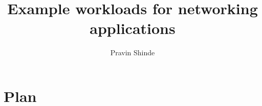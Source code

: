 \documentclass{book}
\begin{document}
\title{Example workloads for networking applications}

\author{
Pravin Shinde
}

\date{}

\maketitle

\tableofcontents
\chapter{Plan}

%
%




\end{document}
